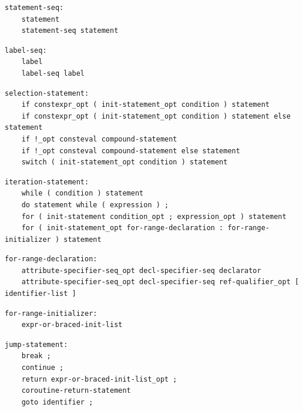 \noindent\textbf{\texttt{}}\par
\begin{lstlisting}
statement-seq:
    statement
    statement-seq statement
\end{lstlisting}

\noindent\textbf{\texttt{}}\par
\begin{lstlisting}
label-seq:
    label
    label-seq label
\end{lstlisting}

\noindent\textbf{\texttt{}}\par
\begin{lstlisting}
selection-statement:
    if constexpr_opt ( init-statement_opt condition ) statement
    if constexpr_opt ( init-statement_opt condition ) statement else statement
    if !_opt consteval compound-statement
    if !_opt consteval compound-statement else statement
    switch ( init-statement_opt condition ) statement
\end{lstlisting}

\noindent\textbf{\texttt{}}\par
\begin{lstlisting}
iteration-statement:
    while ( condition ) statement
    do statement while ( expression ) ;
    for ( init-statement condition_opt ; expression_opt ) statement
    for ( init-statement_opt for-range-declaration : for-range-initializer ) statement
\end{lstlisting}

\noindent\textbf{\texttt{}}\par
\begin{lstlisting}
for-range-declaration:
    attribute-specifier-seq_opt decl-specifier-seq declarator
    attribute-specifier-seq_opt decl-specifier-seq ref-qualifier_opt [ identifier-list ]
\end{lstlisting}

\noindent\textbf{\texttt{}}\par
\begin{lstlisting}
for-range-initializer:
    expr-or-braced-init-list
\end{lstlisting}

\noindent\textbf{\texttt{}}\par
\begin{lstlisting}
jump-statement:
    break ;
    continue ;
    return expr-or-braced-init-list_opt ;
    coroutine-return-statement
    goto identifier ;
\end{lstlisting}

